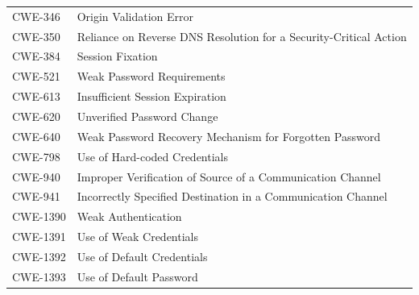 \documentclass[11pt]{article}
\begin{document}
\begin{longtable}{@{}p{2.4cm}p{12.0cm}@{}}
CWE-346  & Origin Validation Error \\
CWE-350  & Reliance on Reverse DNS Resolution for a Security-Critical Action \\
CWE-384  & Session Fixation \\
CWE-521  & Weak Password Requirements \\
CWE-613  & Insufficient Session Expiration \\
CWE-620  & Unverified Password Change \\
CWE-640  & Weak Password Recovery Mechanism for Forgotten Password \\
CWE-798  & Use of Hard-coded Credentials \\
CWE-940  & Improper Verification of Source of a Communication Channel \\
CWE-941  & Incorrectly Specified Destination in a Communication Channel \\
CWE-1390 & Weak Authentication \\
CWE-1391 & Use of Weak Credentials \\
CWE-1392 & Use of Default Credentials \\
CWE-1393 & Use of Default Password \\

\end{longtable}
\end{document}
